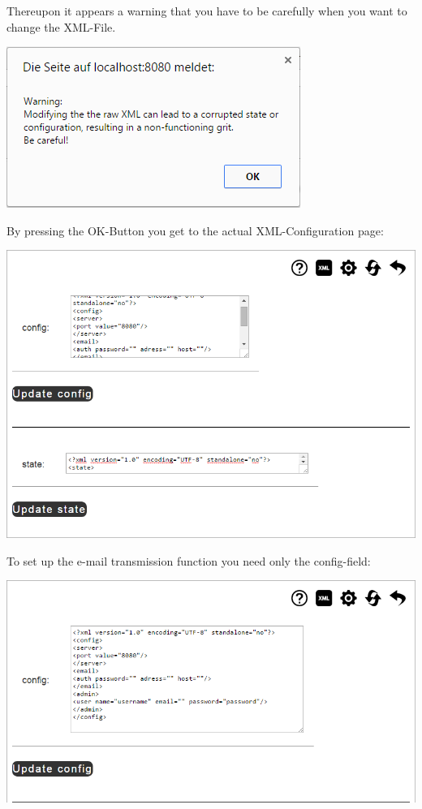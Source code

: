 \documentclass[10pt,a4paper, titlepage, toc=idx]{scrreprt}
\theoremstyle{definition}
\theoremstyle{plain}
\begin{document}
Thereupon it appears a warning that you have to be carefully when you want to change the XML-File. 
\begin{center}
\includegraphics[scale=0.55]{pictures/warning_xml.png} 
\end{center}

By pressing the OK-Button you get to the actual XML-Configuration page:
\begin{center}
\includegraphics[scale=0.55]{pictures/xml.png}
\end{center}

To set up the e-mail transmission function you need only the config-field:
\begin{center}
\includegraphics[scale=0.55]{pictures/config_full.png} 
\end{center}
\end{document}
